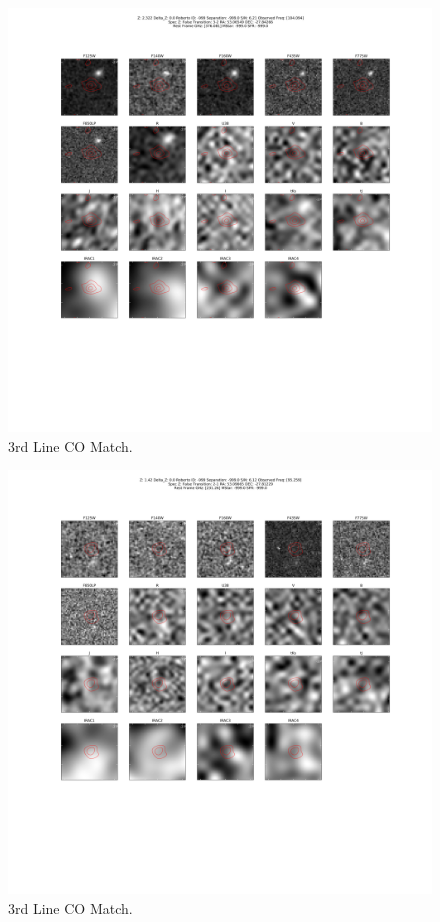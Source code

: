 \begin{figure}[tbp]
\centering \includegraphics[width=120mm]{Matched/ASPECS_Cutout_7.png}
\caption{3rd Line CO Match.}
\label{fig:Match_Three}
\end{figure}

\begin{figure}[tbp]
\centering \includegraphics[width=120mm]{Matched/ASPECS_Cutout_8.png}
\caption{3rd Line CO Match.}
\label{fig:Match_Three}
\end{figure}

